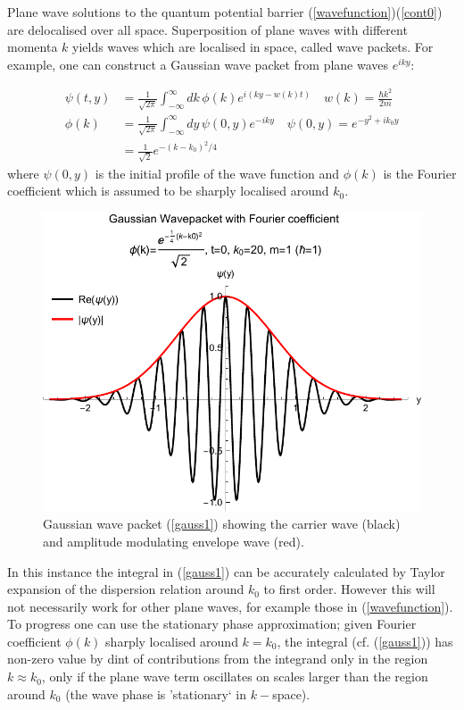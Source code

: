 \documentclass{article}
\begin{document}
Plane wave solutions to the quantum potential barrier (\ref{wavefunction})(\ref{cont0}) are delocalised over all space. Superposition of plane waves with different momenta $k$ yields waves which are localised in space, called wave packets. For example, one can construct a Gaussian wave packet from plane waves $e^{iky}$:

\begin{subequations}
\begin{align}
	\psi(t,y)&=\frac{1}{\sqrt{2\pi}}\int_{-\infty}^{\infty}dk\,\phi(k)e^{i(ky-w(k)t)} \quad w(k)=\frac{\hbar k^2}{2m} \label{gauss1}\\
	\phi(k)&=\frac{1}{\sqrt{2\pi}}\int_{-\infty}^{\infty}dy\,\psi(0,y)e^{-iky} \quad \psi(0,y) = e^{-y^2+ik_0y}\\
	&= \frac{1}{\sqrt{2}}e^{-(k-k_0)^2/4}
	\end{align}
\end{subequations}
\noindent where $\psi(0,y)$ is the initial profile of the wave function and $\phi(k)$ is the Fourier coefficient which is assumed to be sharply localised around $k_0$. 

\begin{figure}[ht]
\centering
\includegraphics{plot4.pdf}
\caption{Gaussian wave packet (\ref{gauss1}) showing the carrier wave (black) and amplitude modulating envelope wave (red).}
\end{figure}

\noindent In this instance the integral in (\ref{gauss1}) can be accurately calculated by Taylor expansion of the dispersion relation around $k_0$ to first order. However this will not necessarily work for other plane waves, for example those in (\ref{wavefunction}). To progress one can use the stationary phase approximation; given Fourier coefficient $\phi(k)$ sharply localised around $k=k_0$, the integral (cf. (\ref{gauss1})) has non-zero value by dint of contributions from the integrand only in the region $k\approx k_0$, only if the plane wave term oscillates on scales larger than the region around $k_0$ (the wave phase is 'stationary` in $k-$space). 
\end{document}
